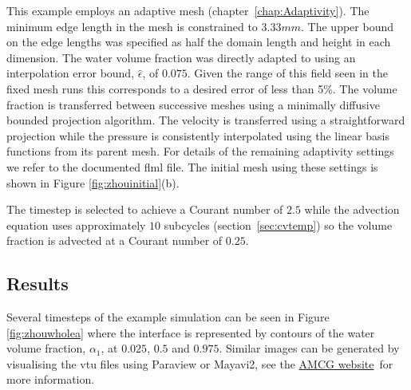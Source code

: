 This example employs an adaptive mesh (chapter~\ref{chap:Adaptivity}). The minimum edge length in the mesh is constrained to $3.33mm$. The upper bound on the edge lengths was specified as half the domain length and height in each dimension.  The water volume fraction was directly adapted to using an interpolation error bound, $\hat{\epsilon}$, of $0.075$. Given the range of this field seen in the fixed mesh runs this corresponds to a desired error of less than 5\%. The volume fraction is transferred between successive meshes using a minimally diffusive bounded projection algorithm.  The velocity is transferred using a straightforward projection while the pressure is consistently interpolated using the linear basis functions from its parent mesh. For details of the remaining adaptivity settings we refer to the documented flml file.  The initial mesh using these settings is shown in Figure \ref{fig:zhouinitial}(b). 

The timestep is selected to achieve a Courant number of $2.5$ while the advection equation uses approximately $10$ subcycles
(section~\ref{sec:cvtemp}) so the volume fraction is advected at a Courant number of $0.25$.  

\subsection{Results}
Several timesteps of the example simulation can be seen in Figure \ref{fig:zhouwholea} where the interface is represented by
contours of the water volume fraction, $\alpha_1$, at $0.025$, $0.5$ and $0.975$.  Similar images can be generated by visualising
the vtu files using Paraview or Mayavi2, see the \href{http://amcg-www.ese.ic.ac.uk/}{AMCG website}\ for more information.

